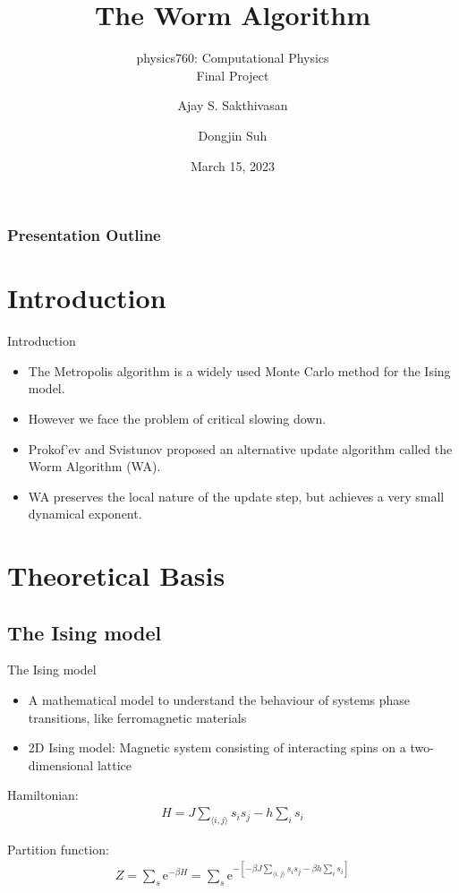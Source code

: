 \documentclass{beamer}
\title{The Worm Algorithm}
\subtitle{physics760: Computational Physics\\Final Project}
\author{Ajay S. Sakthivasan \and Dongjin Suh}
\institute{Universität Bonn}
\date{March 15, 2023}
\begin{document}
\begin{frame}
    \titlepage
\end{frame}

\begin{frame}
    \frametitle{Presentation Outline}
    \tableofcontents
\end{frame}

\section{Introduction}
\begin{frame}{Introduction}
    \begin{itemize}
        \item The Metropolis algorithm is a widely used Monte Carlo method for the Ising model.
        \item However we face the problem of critical slowing down.
        \item Prokof’ev and Svistunov proposed an alternative update algorithm called the Worm Algorithm (WA).
        \item WA preserves the local nature of the update step, but achieves a very small dynamical exponent.
    \end{itemize}
\end{frame}

\section{Theoretical Basis}
\subsection{The Ising model}

\begin{frame}{The Ising model}
\begin{itemize}
    \item A mathematical model to understand the behaviour of systems phase transitions, like ferromagnetic materials
    \item 2D Ising model: Magnetic system consisting of interacting spins on a two-dimensional lattice
\end{itemize}

Hamiltonian: 
    \begin{align*}
    H = J\sum_{\langle i,j \rangle} s_{i}s_{j} - h\sum_{i} s_{i}
\end{align*}

Partition function: 
\begin{align*}
    Z = \sum_{s} \mathrm{e}^{-\beta H} = \sum_{s} \mathrm{e}^{-[-\beta J \sum_{\langle i,j \rangle}s_i s_j - \beta h \sum_{i}s_i]}
\end{align*}
\end{frame}
\end{document}
